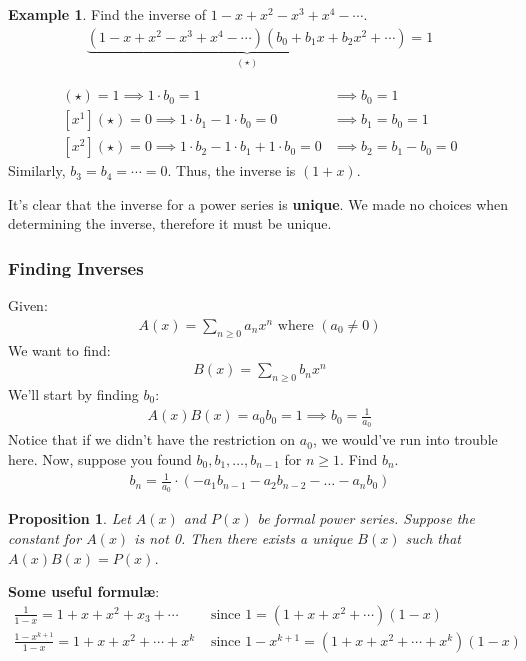 \documentclass[]{article}
\newtheorem{proposition}{Proposition}[section]
\theoremstyle{definition}
\newtheorem{ex}{Example}[section]
\newcommand{\lecture}[1]{\marginpar{{\footnotesize $\leftarrow$ \underline{#1}}}}
\begin{document}
			\begin{ex}
				Find the inverse of $1 - x + x^2 - x^3 + x^4 - \cdots$.
				\begin{align*}
					\underbrace{(1 - x + x^2 - x^3 + x^4 - \cdots)(b_0 + b_1x + b_2x^2 + \cdots)}_{(\star)} = 1
				\end{align*}
				
				\begin{align*}
					[x^0](\star) = 1 \implies 1 \cdot b_0 = 1 &\implies b_0 = 1 \\
					[x^1](\star) = 0 \implies 1 \cdot b_1 - 1 \cdot b_0 = 0 &\implies b_1 = b_0 = 1 \\
					[x^2](\star) = 0 \implies 1 \cdot b_2 - 1 \cdot b_1 + 1 \cdot b_0 = 0 &\implies b_2 = b_1 - b_0 = 0
				\end{align*}
				Similarly, $b_3 = b_4 = \cdots = 0$. Thus, the inverse is $(1 + x)$.
			\end{ex}

			It's clear that the inverse for a power series is \textbf{unique}. We made no choices when determining the inverse, therefore it must be unique.
			\subsubsection{Finding Inverses} \lecture{January 16, 2013}
				Given:
				\begin{align*}
					A(x) = \sum_{n \ge 0} a_nx^n \text{ where } (a_0 \ne 0)
				\end{align*}
				We want to find:
				\begin{align*}
					B(x) = \sum_{n \ge 0} b_nx^n
				\end{align*}
				We'll start by finding $b_0$:
				\begin{align*}
					[x^0]A(x)B(x) = a_0b_0 = 1 \implies b_0 = \frac{1}{a_0}
				\end{align*}
				Notice that if we didn't have the restriction on $a_0$, we would've run into trouble here. Now, suppose you found $b_0, b_1, \ldots, b_{n - 1}$ for $n \ge 1$. Find $b_n$.
				\begin{align*}
					b_n = \frac{1}{a_0} \cdot (-a_1b_{n - 1} - a_2b_{n - 2} - \ldots - a_nb_0)
				\end{align*}

				\begin{proposition}
					Let $A(x)$ and $P(x)$ be formal power series.
					Suppose the constant for $A(x)$ is not 0. Then there exists a unique $B(x)$ such that $A(x)B(x) = P(x)$.
				\end{proposition}
				\textbf{Some useful formul\ae}:
					\begin{align*}
						\frac{1}{1 - x} = 1 + x + x^2 + x_3 + \cdots &\text{ since } 1 = (1 + x + x^2 + \cdots)(1 - x) \\
						\frac{1 - x^{k+1}}{1-x} = 1 + x + x^2 + \cdots + x^k &\text{ since } 1 - x^{k+1} = (1 + x + x^2 + \cdots + x^k)(1-x) 
					\end{align*}
\end{document}
